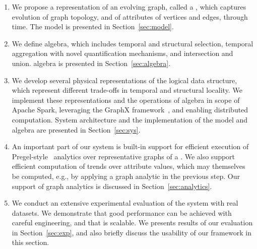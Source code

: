 \begin{enumerate}[noitemsep,leftmargin=*]

\item We propose a representation of an evolving graph, called a \tg,
  which captures evolution of graph topology, and of attributes of
  vertices and edges, through time.  The \tg model is presented in
  Section~\ref{sec:model}.

\item We define \tg algebra, which includes temporal and structural
  selection, temporal aggregation with novel quantification
  mechanisms, and \tg intersection and union.  \tg algebra is presented in
  Section~\ref{sec:algebra}.

\item We develop several physical representations of the logical \tg
  data structure, which represent different trade-offs in temporal and
  structural locality.  We implement these representations
  and the operations of \tg algebra in scope of Apache Spark,
  leveraging the GraphX
  framework~\cite{DBLP:conf/osdi/GonzalezXDCFS14}, and enabling
  distributed computation. System architecture and the implementation
  of the \tg model and algebra are presented in Section~\ref{sec:sys}.

\item An important part of our system is built-in support for
  efficient execution of
  Pregel-style~\cite{DBLP:conf/sigmod/MalewiczABDHLC10} analytics over
  representative graphs of a \tg.  We also support efficient
  computation of trends over attribute values, which may themselves be
  computed, e.g., by applying a graph analytic in the previous step.
  Our support of graph analytics is discussed in
  Section~\ref{sec:analytics}.

\item We conduct an extensive experimental evaluation of the \ql
  system with real datasets.  We demonstrate that good performance can
  be achieved with careful engineering, and that \ql is scalable.  We
  presents results of our evaluation in Section~\ref{sec:exp}, and
  also briefly discuss the usability of our framework in this section.

\end{enumerate}

